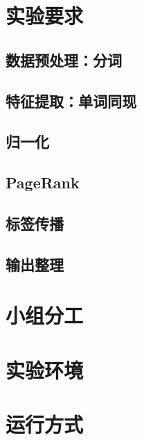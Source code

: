 \section{实验要求}
\subsection{数据预处理：分词}

\subsection{特征提取：单词同现}
\subsection{归一化}
\subsection{PageRank}
\subsection{标签传播}
\subsection{输出整理}

\section{小组分工}
\section{实验环境}
\section{运行方式}
